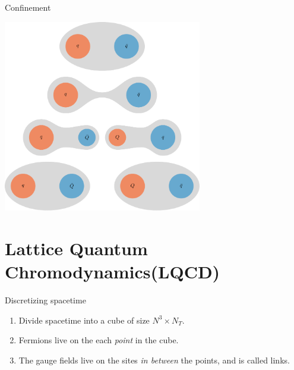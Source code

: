 \documentclass[10pt,show notes on second screen]{beamer}
\begin{document}
\begin{frame}{Confinement}
    \begin{center}
        \includegraphics[width=0.65\textwidth]{../figures/illustrations/qcd/confinement/string-breaking.pdf}
    \end{center}
\end{frame}

\section{Lattice Quantum Chromodynamics(LQCD)}

\begin{frame}{Discretizing spacetime}
\begin{block}{}
\begin{enumerate}
    \item <1->Divide spacetime into a cube of size $N^3\times N_T$.
    \item <2->Fermions live on the each \textit{point} in the cube.
    \item <3->The gauge fields live on the sites \textit{in between} the points, and is called links.
\end{enumerate}
\end{block}
\end{frame}
\end{document}
